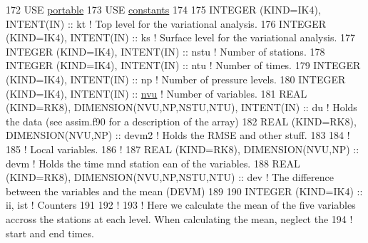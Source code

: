 \begin{DoxyCode}
172 \textcolor{keywordtype}{USE }\hyperlink{namespaceportable}{portable}
173 \textcolor{keywordtype}{USE }\hyperlink{namespaceconstants}{constants}
174 
175 \textcolor{keywordtype}{INTEGER (KIND=IK4)}, \textcolor{keywordtype}{INTENT(IN)}                          :: kt       \textcolor{comment}{! Top level for the variational
       analysis.}
176 \textcolor{keywordtype}{INTEGER (KIND=IK4)}, \textcolor{keywordtype}{INTENT(IN)}                          :: ks       \textcolor{comment}{! Surface level for the variational
       analysis.}
177 \textcolor{keywordtype}{INTEGER (KIND=IK4)}, \textcolor{keywordtype}{INTENT(IN)}                          :: nstu     \textcolor{comment}{! Number of stations.}
178 \textcolor{keywordtype}{INTEGER (KIND=IK4)}, \textcolor{keywordtype}{INTENT(IN)}                          :: ntu      \textcolor{comment}{! Number of times.}
179 \textcolor{keywordtype}{INTEGER (KIND=IK4)}, \textcolor{keywordtype}{INTENT(IN)}                          :: np       \textcolor{comment}{! Number of pressure levels.}
180 \textcolor{keywordtype}{INTEGER (KIND=IK4)}, \textcolor{keywordtype}{INTENT(IN)}                          :: \hyperlink{namespacesettings_a79e2ff19d589b215ed9176906dd5cbbf}{nvu}      \textcolor{comment}{! Number of variables.}
181 \textcolor{keywordtype}{REAL (KIND=RK8)}, \textcolor{keywordtype}{DIMENSION(NVU,NP,NSTU,NTU)}, \textcolor{keywordtype}{INTENT(IN)} :: du       \textcolor{comment}{! Holds the data (see assim.f90 for a
       description of the array)}
182 \textcolor{keywordtype}{REAL (KIND=RK8)}, \textcolor{keywordtype}{DIMENSION(NVU,NP)}                      :: devm2    \textcolor{comment}{! Holds the RMSE and other stuff.}
183 
184 \textcolor{comment}{!}
185 \textcolor{comment}{! Local variables.}
186 \textcolor{comment}{!}
187 \textcolor{keywordtype}{REAL (KIND=RK8)}, \textcolor{keywordtype}{DIMENSION(NVU,NP)}                      :: devm     \textcolor{comment}{! Holds the time mnd station ean of the
       variables.}
188 \textcolor{keywordtype}{REAL (KIND=RK8)}, \textcolor{keywordtype}{DIMENSION(NVU,NP,NSTU,NTU)}             :: dev      \textcolor{comment}{! The difference between the variables
       and the mean (DEVM)}
189 
190 \textcolor{keywordtype}{INTEGER (KIND=IK4)}                                      :: ii, ist  \textcolor{comment}{!  Counters}
191 
192 \textcolor{comment}{!}
193 \textcolor{comment}{! Here we calculate the mean of the five variables accross the stations at each level. When calculating the
       mean, neglect the}
194 \textcolor{comment}{! start and end times.}

\end{DoxyCode}
